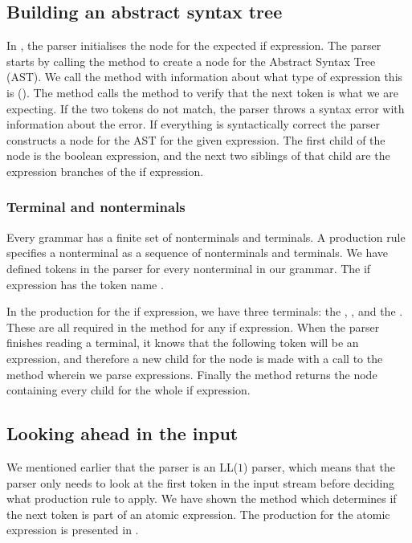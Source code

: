 \subsection{Building an abstract syntax tree}
In , the parser initialises the node for the
expected if expression. The parser starts by calling the method
 to create a node for the Abstract Syntax Tree (AST).
We call the method with information about what type of expression this
is (). The method calls the  method
to verify that the next token is what we are expecting. If the two
tokens do not match, the parser throws a syntax error with information
about the error. If everything is syntactically correct the parser
constructs a node for the AST for the given expression. The first child
of the node is the boolean expression, and the next two siblings of that
child are the expression branches of the if expression.

\subsubsection{Terminal and nonterminals}
Every grammar has a finite set of nonterminals and terminals. 
A production rule specifies a nonterminal as a sequence of nonterminals and terminals. 
We have defined tokens in the
parser for every nonterminal in our grammar. The if expression has the
token name .

In the production for the if expression, we have three terminals: the ,
, and the . These are all required in the method for any
if expression. When the parser finishes reading a terminal, it knows that the
following token will be an expression, and therefore a new child for the node is
made with a call to the  method wherein we parse
expressions. Finally the method returns the node containing every child for the
whole if expression.

\subsection{Looking ahead in the input}
We mentioned earlier that the parser is an LL($1$) parser, which means that the
parser only needs to look at the first token in the input stream before deciding what production rule to apply. 
We have shown the  method which determines if the next token is part of an
atomic expression. The production for the atomic expression is presented in
.

